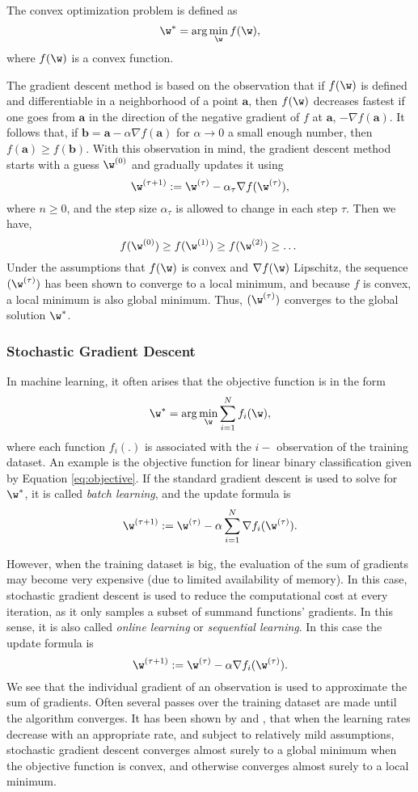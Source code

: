 The convex optimization problem is defined as 
$$ \w^* = \arg \min_{\w} f(\w),$$
where $f(\w)$ is a convex function. 

The gradient descent method \cite{Cauchy} is based on the observation that if $f(\w)$ is defined and differentiable in a neighborhood of a point $\boldsymbol{a}$, then $f(\w)$ decreases fastest if one goes from $\boldsymbol{a}$ in the direction of the negative gradient of $f$ at $\boldsymbol{a}$, $-\nabla f(\boldsymbol{a})$. It follows that, if $\boldsymbol{b} = \boldsymbol{a} - \alpha \nabla f(\boldsymbol{a})$ for $\alpha \rightarrow 0$ a small enough number, then $f(\boldsymbol{a}) \geq f(\boldsymbol{b})$. With this observation in mind, the gradient descent method starts with a guess $\w^{(0)}$ and gradually updates it using 
$$\w^{(\tau + 1)} := \w^{(\tau)} - \alpha_{\tau} \nabla f(\w^{(\tau)}), $$
where $n \geq 0$, and the step size $\alpha_{\tau}$ is allowed to change in each step $\tau$. Then we have, 
$$f(\w^{(0)}) \geq f(\w^{(1)}) \geq f(\w^{(2)}) \geq \dots \;$$
Under the assumptions that $f(\w)$ is convex and $\nabla f(\w)$ Lipschitz, the sequence $(\w^{(\tau)})$ has been shown to converge to a local minimum, and because $f$ is convex, a local minimum is also global minimum. Thus, $(\w^{(\tau)})$ converges to the global solution $\w^*$.

\subsubsection{Stochastic Gradient Descent}
\label{ssec:sgd}

In machine learning, it often arises that the objective function is in the form
$$ \w^* = \arg \min_{\w} \sum_{i=1}^N f_i(\w),$$
where each function $f_i(.)$ is associated with the $i-$ observation of the training dataset. An example is the objective function for linear binary classification given by Equation \ref{eq:objective}. If the standard gradient descent is used to solve for $\w^*$, it is called \emph{batch learning}, and the update formula is 
$$\w^{(\tau +1)} := \w^{(\tau)} - \alpha \sum_{i=1}^N \nabla f_i(\w^{(\tau)}).$$

However, when the training dataset is big, the evaluation of the sum of gradients may become very expensive (due to limited availability of memory). In this case, stochastic gradient descent \cite{Davidon} is used to reduce the computational cost at every iteration, as it only samples a subset of summand functions' gradients. In this sense, it is also called \emph{online learning} or \emph{sequential learning}. In this case the update formula is 
$$\w^{(\tau +1)} := \w^{(\tau)} - \alpha \nabla f_i(\w^{(\tau)}).$$
We see that the individual gradient of an observation is used to approximate the sum of gradients. Often several passes over the training dataset are made until the algorithm converges. It has been shown by \cite{Bottou} and \cite{Kiwiel}, that when the learning rates decrease with an appropriate rate, and subject to relatively mild assumptions, stochastic gradient descent converges almost surely to a global minimum when the objective function is convex, and otherwise converges almost surely to a local minimum. 


